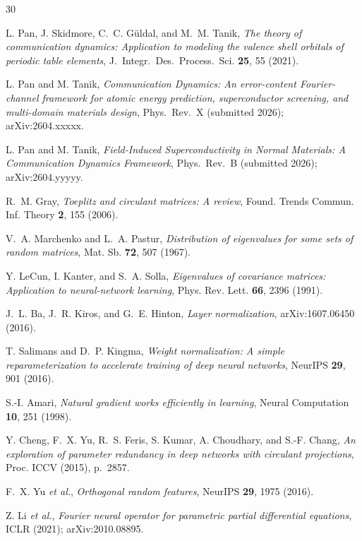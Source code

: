 \documentclass[aps,prx,onecolumn,11pt,nofootinbib,longbibliography]{revtex4-2}
\begin{document}
\begin{thebibliography}{30}

L. Pan, J. Skidmore, C.~C. G\"uldal, and M.~M. Tanik,
\textit{The theory of communication dynamics: Application to modeling the
valence shell orbitals of periodic table elements},
J.~Integr.~Des.~Process.~Sci. \textbf{25}, 55 (2021).

L. Pan and M. Tanik, \textit{Communication Dynamics: An error-content
Fourier-channel framework for atomic energy prediction, superconductor
screening, and multi-domain materials design}, Phys.~Rev.~X (submitted 2026);
arXiv:2604.xxxxx.

L. Pan and M. Tanik, \textit{Field-Induced Superconductivity in Normal
Materials: A Communication Dynamics Framework}, Phys.~Rev.~B (submitted 2026);
arXiv:2604.yyyyy.

R.~M. Gray, \textit{Toeplitz and circulant matrices: A review},
Found. Trends Commun. Inf. Theory \textbf{2}, 155 (2006).

V.~A. Marchenko and L.~A. Pastur,
\textit{Distribution of eigenvalues for some sets of random matrices},
Mat. Sb. \textbf{72}, 507 (1967).

Y. LeCun, I. Kanter, and S.~A. Solla,
\textit{Eigenvalues of covariance matrices: Application to neural-network
learning}, Phys. Rev. Lett. \textbf{66}, 2396 (1991).

J.~L. Ba, J.~R. Kiros, and G.~E. Hinton, \textit{Layer normalization},
arXiv:1607.06450 (2016).

T. Salimans and D.~P. Kingma, \textit{Weight normalization: A simple
reparameterization to accelerate training of deep neural networks},
NeurIPS \textbf{29}, 901 (2016).

S.-I. Amari, \textit{Natural gradient works efficiently in learning},
Neural Computation \textbf{10}, 251 (1998).

Y. Cheng, F.~X. Yu, R.~S. Feris, S. Kumar, A. Choudhary, and S.-F. Chang,
\textit{An exploration of parameter redundancy in deep networks with
circulant projections}, Proc. ICCV (2015), p.~2857.

F.~X. Yu \textit{et al.},
\textit{Orthogonal random features},
NeurIPS \textbf{29}, 1975 (2016).

Z. Li \textit{et al.}, \textit{Fourier neural operator for parametric partial
differential equations}, ICLR (2021); arXiv:2010.08895.


\end{thebibliography}
\end{document}
